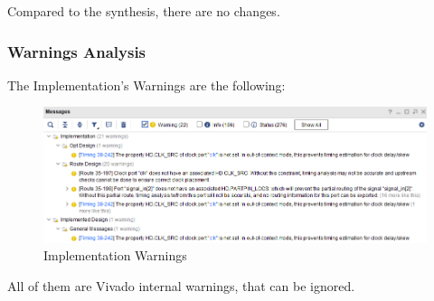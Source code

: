 Compared to the synthesis, there are no changes.

\subsubsection{Warnings Analysis}

The Implementation's Warnings are the following:

\begin{figure}[H]
    \centering
    \includegraphics[width=1\textwidth]{img/Chapter5/ImplementationWarning.png}
    \caption{Implementation Warnings}
    \label{fig:IW}
\end{figure}

All of them are Vivado internal warnings, that can be ignored.